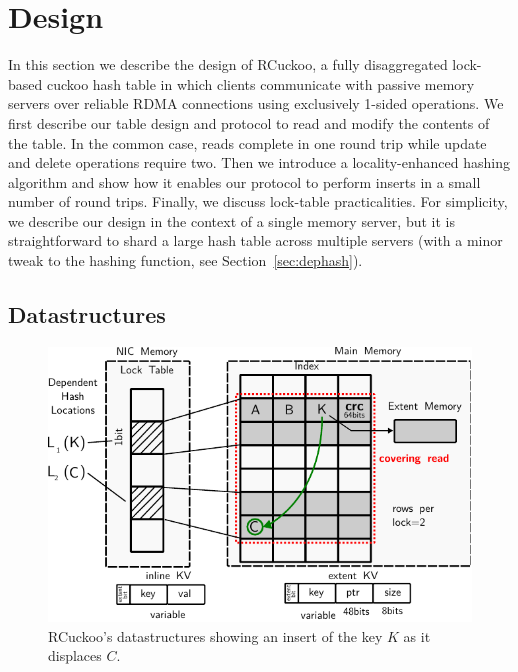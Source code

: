 \section{Design}
\label{sec:design}

In this section we describe the design of RCuckoo, a fully
disaggregated lock-based cuckoo hash table in which clients
communicate with passive memory servers over reliable RDMA connections
using exclusively 1-sided operations.  We first describe our table
design and protocol to read and modify the contents of the table.  In
the common case, reads complete in one round trip while update and
delete operations require two.  Then we introduce a locality-enhanced
hashing algorithm and show how it enables our protocol to perform
inserts in a small number of round trips.  Finally, we discuss
lock-table practicalities.  For simplicity, we describe our design in
the context of a single memory server, but it is straightforward to
shard a large hash table across multiple servers (with a minor tweak
to the hashing function, see Section~\ref{sec:dephash}).

\subsection{Datastructures}
\label{sec:table-design}

\begin{figure}[t]
    \includegraphics[width=0.99\linewidth]{fig/table-diagram.pdf}
    \caption{RCuckoo's datastructures showing an insert of the key $K$ as it displaces $C$.}
    \label{fig:table-diagram}
\end{figure}

